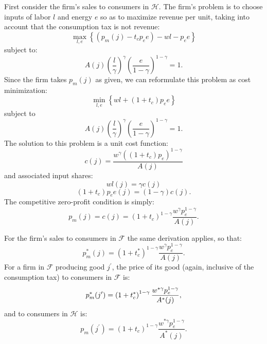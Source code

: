 \documentclass[notitlepage,12pt]{article}
\begin{document}
First consider the firm's sales to consumers in $\mathcal{H}$. The firm's
problem is to choose inputs of labor $l$ and energy $e$ so as to maximize
revenue per unit, taking into account that the consumption tax is not
revenue:%
\begin{equation*}
\max_{l,e}\left\{ \left( p_{m}(j)-t_{c}p_{e}e\right) -wl-p_{e}e\right\}
\end{equation*}%
subject to:%
\begin{equation*}
A(j)\left( \frac{l}{\gamma }\right) ^{\gamma }\left( \frac{e}{1-\gamma }%
\right) ^{1-\gamma }=1.
\end{equation*}%
Since the firm takes $p_{m}(j)$ as given, we can reformulate this problem as
cost minimization:%
\begin{equation*}
\min_{l,e}\left\{ wl+\left( 1+t_{c}\right) p_{e}e\right\}
\end{equation*}%
subject to%
\begin{equation*}
A(j)\left( \frac{l}{\gamma }\right) ^{\gamma }\left( \frac{e}{1-\gamma }%
\right) ^{1-\gamma }=1.
\end{equation*}%
The solution to this problem is a unit cost function:%
\begin{equation*}
c(j)=\frac{w^{\gamma }\left( \left( 1+t_{c}\right) p_{e}\right) ^{1-\gamma }%
}{A(j)}
\end{equation*}%
and associated input shares:%
\begin{equation*}
wl(j)=\gamma c(j)
\end{equation*}%
\begin{equation*}
\left( 1+t_{c}\right) p_{e}e(j)=\left( 1-\gamma \right) c(j).
\end{equation*}%
The competitive zero-profit condition is simply:%
\begin{equation*}
p_{m}(j)=c(j)=\left( 1+t_{c}\right) ^{1-\gamma }\frac{w^{\gamma
}p_{e}^{1-\gamma }}{A(j)}.
\end{equation*}

For the firm's sales to consumers in $\mathcal{F}$ the same derivation
applies, so that:%
\begin{equation*}
p_{m}^{\ast }(j)=\left( 1+t_{c}^{\ast }\right) ^{1-\gamma }\frac{w^{\gamma
}p_{e}^{1-\gamma }}{A(j)}.
\end{equation*}%
For a firm in $\mathcal{F}$ producing good $j^{\prime }$, the price of its
good (again, inclusive of the consumption tax) to consumers in $\mathcal{F}$
is:%
\begin{equation*}
p_{m}^{\ast }(j^{\prime })=\left( 1+t_{c}^{\ast }\right) ^{1-\gamma }\frac{%
w^{\ast \gamma }p_{e}^{1-\gamma }}{A^{\ast }(j)},
\end{equation*}%
and to consumers in $\mathcal{H}$ is:%
\begin{equation*}
p_{m}(j^{\prime })=\left( 1+t_{c}\right) ^{1-\gamma }\frac{w^{\ast \gamma
}p_{e}^{1-\gamma }}{A^{\ast }(j)}.
\end{equation*}
\end{document}
